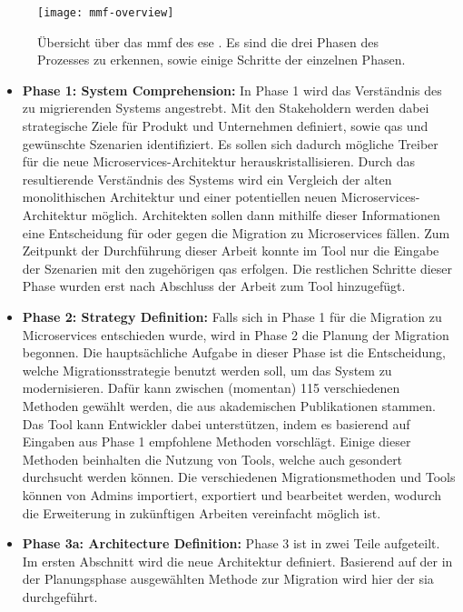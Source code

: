 \begin{figure}
	\centering
	\texttt{[image: mmf-overview]}
	\caption[Übersicht über \acrshort{mmf}]{
		Übersicht über das \gls{mmf} des \gls{ese} \cite{fritzsch2022architecturecentric}. Es sind die drei Phasen des Prozesses zu erkennen, sowie einige Schritte der einzelnen Phasen.
	}
	\label{fig:mmf-overview}
\end{figure}

\begin{itemize}
	\item \textbf{Phase 1: System Comprehension:}
	In Phase 1 wird das Verständnis des zu migrierenden Systems angestrebt.
	Mit den Stakeholdern werden dabei strategische Ziele für Produkt und Unternehmen definiert, sowie \glspl{qa} und gewünschte Szenarien identifiziert.
	Es sollen sich dadurch mögliche Treiber für die neue Microservices-Architektur herauskristallisieren.
	Durch das resultierende Verständnis des Systems wird ein Vergleich der alten monolithischen Architektur und einer potentiellen neuen Microservices-Architektur möglich.
	Architekten sollen dann mithilfe dieser Informationen eine Entscheidung für oder gegen die Migration zu Microservices fällen.
	Zum Zeitpunkt der Durchführung dieser Arbeit konnte im Tool nur die Eingabe der Szenarien mit den zugehörigen \glspl{qa} erfolgen.
	Die restlichen Schritte dieser Phase wurden erst nach Abschluss der Arbeit zum Tool hinzugefügt.
	\item \textbf{Phase 2: Strategy Definition:}
	Falls sich in Phase 1 für die Migration zu Microservices entschieden wurde, wird in Phase 2 die Planung der Migration begonnen.
	Die hauptsächliche Aufgabe in dieser Phase ist die Entscheidung, welche Migrationsstrategie benutzt werden soll, um das System zu modernisieren.
	Dafür kann zwischen (momentan) 115 verschiedenen Methoden gewählt werden, die aus akademischen Publikationen stammen.
	Das Tool kann Entwickler dabei unterstützen, indem es basierend auf Eingaben aus Phase 1 empfohlene Methoden vorschlägt.
	Einige dieser Methoden beinhalten die Nutzung von Tools, welche auch gesondert durchsucht werden können.
	Die verschiedenen Migrationsmethoden und Tools können von Admins importiert, exportiert und bearbeitet werden, wodurch die Erweiterung in zukünftigen Arbeiten vereinfacht möglich ist.
	\item \textbf{Phase 3a: Architecture Definition:}
	Phase 3 ist in zwei Teile aufgeteilt.
	Im ersten Abschnitt wird die neue Architektur definiert.
	Basierend auf der in der Planungsphase ausgewählten Methode zur Migration wird hier der \gls{sia} durchgeführt.

\end{itemize}
